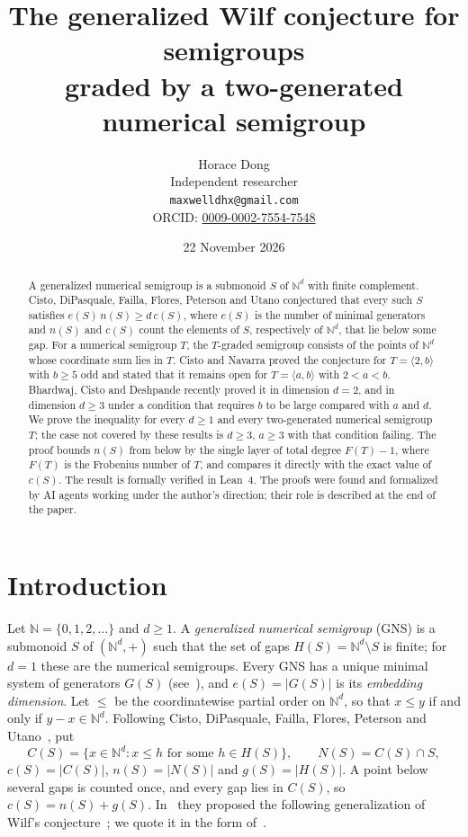 \documentclass[11pt]{article}
\title{The generalized Wilf conjecture for semigroups\\ graded by a two-generated numerical semigroup}
\author{Horace Dong\\ \small Independent researcher\\
\small\texttt{maxwelldhx@gmail.com}\\
\small ORCID: \href{https://orcid.org/0009-0002-7554-7548}{0009-0002-7554-7548}}
\date{22 November 2026}
\theoremstyle{definition}
\theoremstyle{remark}
\newcommand{\N}{\mathbb N}
\begin{document}
\maketitle

\begin{abstract}
A generalized numerical semigroup is a submonoid $S$ of $\N^d$ with finite
complement. Cisto, DiPasquale, Failla, Flores, Peterson and Utano conjectured
that every such $S$ satisfies $e(S)\,n(S)\ge d\,c(S)$, where $e(S)$ is the
number of minimal generators and $n(S)$ and $c(S)$ count the elements of $S$,
respectively of $\N^d$, that lie below some gap. For a numerical semigroup
$T$, the $T$-graded semigroup consists of the points of $\N^d$ whose
coordinate sum lies in $T$. Cisto and Navarra proved the conjecture for
$T=\langle 2,b\rangle$ with $b\ge5$ odd and stated that it remains open for
$T=\langle a,b\rangle$ with $2<a<b$. Bhardwaj, Cisto and Deshpande recently
proved it in dimension $d=2$, and in dimension $d\ge3$ under a condition that
requires $b$ to be large compared with $a$ and $d$. We prove the inequality for
every $d\ge1$ and every two-generated numerical semigroup $T$; the case not covered
by these results is $d\ge3$, $a\ge3$ with that condition failing. The proof bounds $n(S)$ from
below by the single layer of total degree $F(T)-1$, where $F(T)$ is the
Frobenius number of $T$, and compares it directly with the exact value of $c(S)$. The result is formally verified in Lean~4. The
proofs were found and formalized by AI agents working under the author's
direction; their role is described at the end of the paper.
\end{abstract}

\section{Introduction}

Let $\N=\{0,1,2,\dots\}$ and $d\ge1$. A \emph{generalized numerical semigroup}
(GNS) is a submonoid $S$ of $(\N^d,+)$ such that the set of gaps
$H(S)=\N^d\setminus S$ is finite; for $d=1$ these are the numerical semigroups.
Every GNS has a unique minimal system of generators $G(S)$ (see~\cite[§2]{cn}), and
$e(S)=|G(S)|$ is its \emph{embedding dimension}. Let $\le$ be the coordinatewise
partial order on $\N^d$, so that $x\le y$ if and only if $y-x\in\N^d$. Following
Cisto, DiPasquale, Failla, Flores, Peterson and Utano~\cite{cdffpu}, put
\[
C(S)=\{x\in\N^d : x\le h \text{ for some } h\in H(S)\},\qquad
N(S)=C(S)\cap S,
\]
$c(S)=|C(S)|$, $n(S)=|N(S)|$ and $g(S)=|H(S)|$. A point below several gaps is
counted once, and every gap lies in $C(S)$, so $c(S)=n(S)+g(S)$. In~\cite{cdffpu}
they proposed the following generalization of Wilf's conjecture~\cite{wilf}; we
quote it in the form of~\cite[Conjecture~2.1]{cn}.
\end{document}
